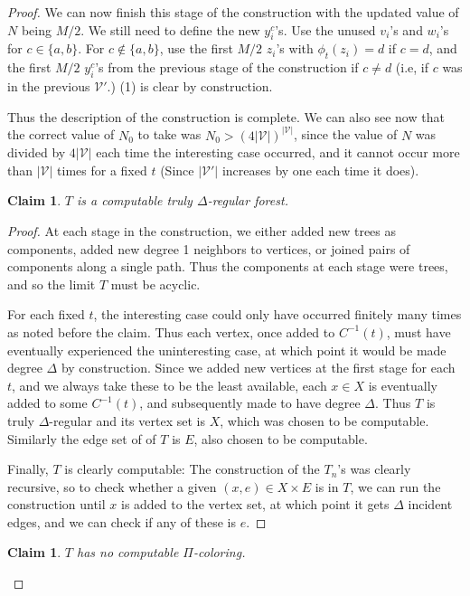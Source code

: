 \documentclass[11pt]{amsart}
\newtheorem{claim}[theorem]{Claim}
\theoremstyle{definition}
\newcommand{\inv}{^{-1}}
\begin{document}
\begin{proof}
We can now finish this stage of the construction with the updated value of $N$ being $M/2$. We still need to define the new $y_i^c$'s. Use the unused $v_i$'s and $w_i$'s for $c \in \{a,b\}$. For $c \not\in \{a,b\}$, use the first $M/2$ $z_i$'s with $\phi_t(z_i) = d$ if $c = d$, and the first $M/2$ $y_i^{c}$'s from the previous stage of the construction if $c \neq d$ (i.e, if $c$ was in the previous $\mathcal{V}'$.) (1) is clear by construction.

Thus the description of the construction is complete. We can also see now that the correct value of $N_0$ to take was $N_0 > (4|\mathcal{V}|)^{|\mathcal{V}|}$, since the value of $N$ was divided by $4|\mathcal{V}|$ each time the interesting case occurred, and it cannot occur more than $|\mathcal{V}|$ times for a fixed $t$ (Since $|\mathcal{V}'|$ increases by one each time it does).


\begin{claim}\label{claim:computable}
$T$ is a computable truly $\Delta$-regular forest.
\end{claim}
\begin{proof}
At each stage in the construction, we either added new trees as components, added new degree 1 neighbors to vertices, or joined pairs of components along a single path. Thus the components at each stage were trees, and so the limit $T$ must be acyclic.

For each fixed $t$, the interesting case could only have occurred finitely many times as noted before the claim. Thus each vertex, once added to $C\inv(t)$, must have eventually experienced the uninteresting case, at which point it would be made degree $\Delta$ by construction. Since we added new vertices at the first stage for each $t$, and we always take these to be the least available, each $x \in X$ is eventually added to some $C\inv(t)$, and subsequently made to have degree $\Delta$. Thus $T$ is truly $\Delta$-regular and its vertex set is $X$, which was chosen to be computable. Similarly the edge set of of $T$ is $E$, also chosen to be computable.

Finally, $T$ is clearly computable: The construction of the $T_n$'s was clearly recursive, so to check whether a given $(x,e) \in X \times E$ is in $T$, we can run the construction until $x$ is added to the vertex set, at which point it gets $\Delta$ incident edges, and we can check if any of these is $e$.
\end{proof}

\begin{claim}
$T$ has no computable $\Pi$-coloring.
\end{claim}


\end{proof}
\end{document}
